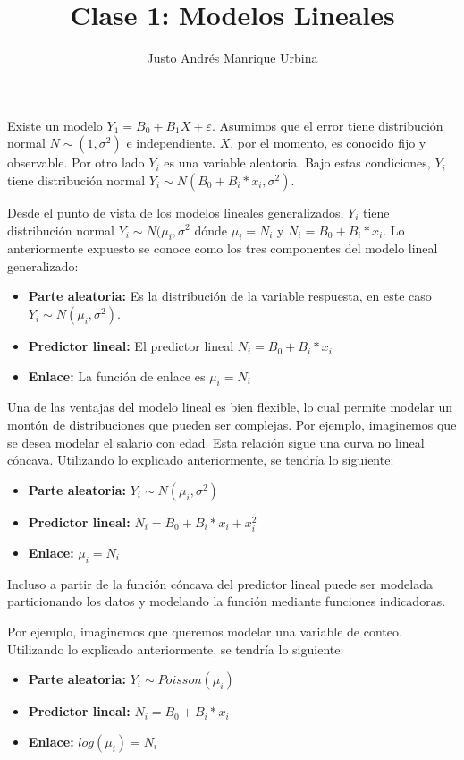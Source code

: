 \documentclass{article}
\title{Clase 1: Modelos Lineales}
\author{Justo Andrés Manrique Urbina}
\begin{document}
\maketitle
Existe un modelo $Y_{1}=B_{0}+B_{1}X+\varepsilon$. Asumimos que el error tiene distribución normal $N\sim(1,\sigma^{2})$ e independiente. $X$, por el momento, es conocido fijo y observable. Por otro lado $Y_{i}$ es una variable aleatoria. Bajo estas condiciones, $Y_{i}$ tiene distribución normal $Y_{i}\sim N(B_{0}+B_{i}*x_{i},\sigma^{2})$.

Desde el punto de vista de los modelos lineales generalizados, $Y_{i}$ tiene distribución normal $Y_{i}\sim N(\mu_{i},\sigma^{2}$ dónde $\mu_{i}=N_{i}$ y $N_{i}=B_{0}+B_{i}*x_{i}$. Lo anteriormente expuesto se conoce como los tres componentes del modelo lineal generalizado:
\begin{itemize}
	\item \textbf{Parte aleatoria:} Es la distribución de la variable respuesta, en este caso $Y_{i}\sim N(\mu_{i},\sigma^{2})$.
	\item \textbf{Predictor lineal:} El predictor lineal $N_{i}=B_{0}+B_{i}*x_{i}$
	\item \textbf{Enlace:} La función de enlace es $\mu_{i}=N_{i}$
\end{itemize}

Una de las ventajas del modelo lineal es bien flexible, lo cual permite modelar un montón de distribuciones que pueden ser complejas. Por ejemplo, imaginemos que se desea modelar el salario con edad. Esta relación sigue una curva no lineal cóncava. Utilizando lo explicado anteriormente, se tendría lo siguiente:

\begin{itemize}
	\item \textbf{Parte aleatoria:} $Y_{i}\sim N(\mu_{i},\sigma^{2})$
	\item \textbf{Predictor lineal:} $N_{i}=B_{0}+B_{i}*x_{i}+x_{i}^{2}$
	\item \textbf{Enlace:} $\mu_{i}=N_{i}$
\end{itemize}

Incluso a partir de la función cóncava del predictor lineal puede ser modelada particionando los datos y modelando la función mediante funciones indicadoras.

Por ejemplo, imaginemos que queremos modelar una variable de conteo. Utilizando lo explicado anteriormente, se tendría lo siguiente:

\begin{itemize}
	\item \textbf{Parte aleatoria:} $Y_{i}\sim Poisson(\mu_{i})$
	\item  \textbf{Predictor lineal:} $N_{i}=B_{0}+B_{i}*x_{i}$
	\item \textbf{Enlace:} $log(\mu_{i})=N_{i}$
\end{itemize}
\end{document}

